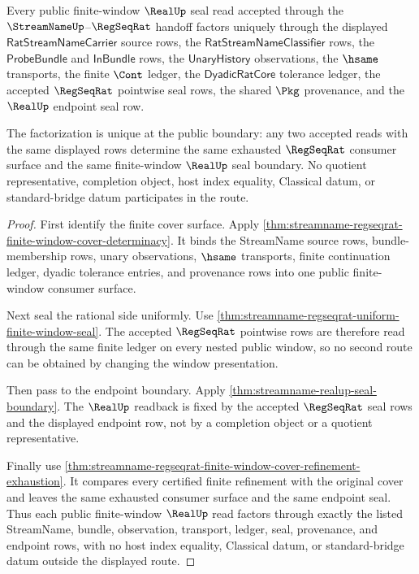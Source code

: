 \begin{theorem}
\label{thm:streamname-regseqrat-real-finite-window-route-factorization}
Every public finite-window $\RealUp$ seal read accepted through the
$\StreamNameUp$--$\RegSeqRat$ handoff factors uniquely through the displayed
$\mathsf{RatStreamNameCarrier}$ source rows, the
$\mathsf{RatStreamNameClassifier}$ rows, the $\mathsf{ProbeBundle}$ and
$\mathsf{InBundle}$ rows, the $\mathsf{UnaryHistory}$ observations, the
$\hsame$ transports, the finite $\Cont$ ledger, the
$\mathsf{DyadicRatCore}$ tolerance ledger, the accepted $\RegSeqRat$
pointwise seal rows, the shared $\Pkg$ provenance, and the $\RealUp$ endpoint
seal row.

The factorization is unique at the public boundary: any two accepted reads with
the same displayed rows determine the same exhausted $\RegSeqRat$ consumer
surface and the same finite-window $\RealUp$ seal boundary. No quotient
representative, completion object, host index equality, Classical datum, or
standard-bridge datum participates in the route.
\end{theorem}
\begin{proof}
First identify the finite cover surface. Apply
\autoref{thm:streamname-regseqrat-finite-window-cover-determinacy}. It binds
the StreamName source rows, bundle-membership rows, unary observations,
$\hsame$ transports, finite continuation ledger, dyadic tolerance entries,
and provenance rows into one public finite-window consumer surface.

Next seal the rational side uniformly. Use
\autoref{thm:streamname-regseqrat-uniform-finite-window-seal}. The accepted
$\RegSeqRat$ pointwise rows are therefore read through the same finite ledger
on every nested public window, so no second route can be obtained by changing
the window presentation.

Then pass to the endpoint boundary. Apply
\autoref{thm:streamname-realup-seal-boundary}. The $\RealUp$ readback is fixed
by the accepted $\RegSeqRat$ seal rows and the displayed endpoint row, not by a
completion object or a quotient representative.

Finally use
\autoref{thm:streamname-regseqrat-finite-window-cover-refinement-exhaustion}.
It compares every certified finite refinement with the original cover and
leaves the same exhausted consumer surface and the same endpoint seal. Thus
each public finite-window $\RealUp$ read factors through exactly the listed
StreamName, bundle, observation, transport, ledger, seal, provenance, and
endpoint rows, with no host index equality, Classical datum, or standard-bridge
datum outside the displayed route.
\end{proof}

